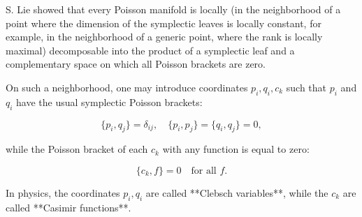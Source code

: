 S. Lie showed that every Poisson manifold is locally (in the neighborhood of a point where the dimension of the symplectic leaves is locally constant, for example, in the neighborhood of a generic point, where the rank is locally maximal) decomposable into the product of a symplectic leaf and a complementary space on which all Poisson brackets are zero.

On such a neighborhood, one may introduce coordinates $p_i, q_i, c_k$ such that $p_i$ and $q_i$ have the usual symplectic Poisson brackets:

$$\{p_i, q_j\} = \delta_{ij}, \quad \{p_i, p_j\} = \{q_i, q_j\} = 0,$$

while the Poisson bracket of each $c_k$ with any function is equal to zero:

$$\{c_k, f\} = 0 \quad \text{for all } f.$$

In physics, the coordinates $p_i, q_i$ are called **Clebsch variables**, while the $c_k$ are called **Casimir functions**.

